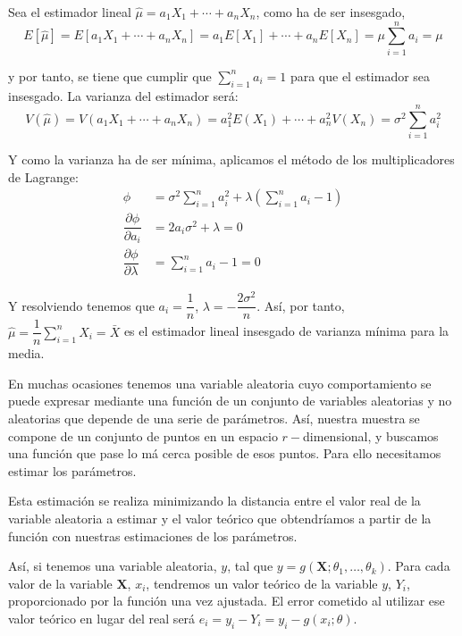 
Sea el estimador lineal $\hat{\mu}=a_1X_1+\cdots+a_nX_n$, como ha de ser insesgado, 
\begin{equation*}
E\left[\hat{\mu}\right]=E\left[a_1X_1+\cdots+a_nX_n\right]=a_1E\left[X_1\right]+\cdots+a_nE\left[X_n\right]=\mu\sum_{i=1}^na_i=\mu
\end{equation*}

y por tanto, se tiene que cumplir que $\sum_{i=1}^na_i=1$ para que el estimador sea insesgado.
La varianza del estimador ser\'a:
\begin{equation*}
V\left(\hat{\mu}\right)=V\left(a_1X_1+\cdots+a_nX_n\right)=a_1^2E\left(X_1\right)+\cdots+a_n^2V\left(X_n\right)=\sigma^2\sum_{i=1}^na_i^2
\end{equation*}

Y como la varianza ha de ser m\'inima, aplicamos el m\'etodo de los multiplicadores de Lagrange:
\begin{align*}
\phi&=\sigma^2\sum_{i=1}^na_i^2+\lambda\left(\sum_{i=1}^na_i-1\right) \\
\dfrac{\partial\phi}{\partial a_i}&=2a_i\sigma^2+\lambda=0 \\
\dfrac{\partial\phi}{\partial\lambda}&=\sum_{i=1}^na_i-1=0
\end{align*}

Y resolviendo tenemos que $a_i=\dfrac{1}{n}$, $\lambda=-\dfrac{2\sigma^2}{n}$. As\'i, por tanto, $\hat{\mu}=\dfrac{1}{n}\sum_{i=1}^nX_i=\bar{X}$ es el estimador lineal insesgado de varianza m\'inima para la media.



En muchas ocasiones tenemos una variable aleatoria cuyo comportamiento se puede expresar mediante una funci\'on de un conjunto de variables aleatorias y no aleatorias que depende de una serie de par\'ametros. As\'i, nuestra muestra se compone de un conjunto de puntos en un espacio $r-$dimensional, y buscamos una funci\'on que pase lo m\'a cerca posible de esos puntos. Para ello necesitamos estimar los par\'ametros.

Esta estimaci\'on se realiza minimizando la distancia entre el valor real de la variable aleatoria  a estimar y el valor te\'orico que obtendr\'iamos a partir de la funci\'on con nuestras estimaciones de los par\'ametros.

As\'i, si tenemos una variable aleatoria, $y$, tal que $y=g(\boldsymbol{X};\theta_1,\ldots,\theta_k)$. Para cada valor de la variable $\boldsymbol{X}$, $x_i$, tendremos un valor te\'orico de la variable $y$, $Y_i$, proporcionado por la funci\'on una vez ajustada. El error cometido al utilizar ese valor te\'orico en lugar del real ser\'a $e_i=y_i-Y_i=y_i-g(x_i;\theta)$.

